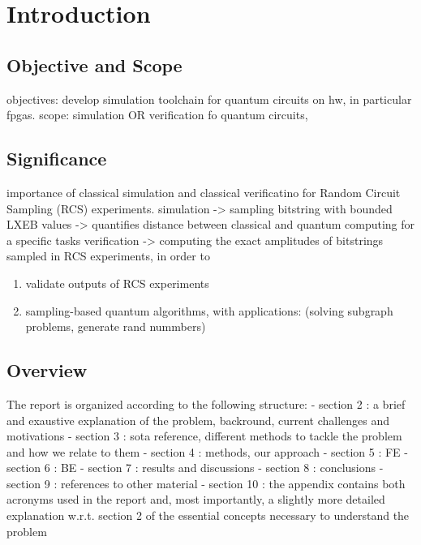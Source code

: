 \documentclass[12pt,oneside,a4paper]{article}
\begin{document}
\section{Introduction}

\subsection{Objective and Scope}
objectives: develop simulation toolchain for quantum circuits on hw, in particular fpgas.
scope: simulation OR verification fo quantum circuits,

\subsection{Significance}
importance of classical simulation and classical verificatino for Random Circuit Sampling (RCS) experiments.
simulation -> sampling bitstring with bounded LXEB values -> quantifies distance between classical and quantum computing for a specific tasks
verification -> computing the exact amplitudes of bitstrings sampled in RCS experiments, in order to
\begin{enumerate}
	\item validate outputs of RCS experiments
	\item sampling-based quantum algorithms, with applications: (solving subgraph problems, generate rand nummbers)
\end{enumerate}



\subsection{Overview}
The report is organized according to the following structure:
- section 2 : a brief and exaustive explanation of the problem, backround, current challenges and motivations
- section 3 : sota reference, different methods to tackle the problem and how we relate to them
- section 4 : methods, our approach
- section 5 : FE
- section 6 : BE
- section 7 : results and discussions
- section 8 : conclusions
- section 9 : references to other material
- section 10 : the appendix contains both acronyms used in the report and, most importantly, a slightly more detailed explanation w.r.t. section 2 of the essential concepts necessary to understand the problem
\end{document}
